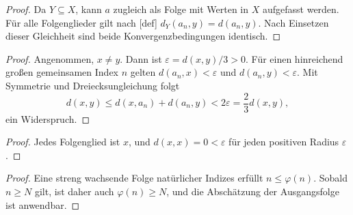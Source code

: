 \documentclass[main.tex]{subfiles}
\begin{document}
\begin{proof}
Da \(Y\subseteq X\), kann \(a\) zugleich als Folge mit Werten in \(X\)
aufgefasst werden. Für alle Folgenglieder gilt nach
[def]
\(d_Y(a_n,y)=d(a_n,y)\). Nach Einsetzen dieser Gleichheit sind beide
Konvergenzbedingungen identisch.
\end{proof}

\begin{proof}
Angenommen, \(x\neq y\). Dann ist
\(\varepsilon=d(x,y)/3>0\). Für einen hinreichend großen gemeinsamen
Index \(n\) gelten
\(d(a_n,x)<\varepsilon\) und \(d(a_n,y)<\varepsilon\). Mit Symmetrie und
Dreiecksungleichung folgt
\[
 d(x,y)\leq d(x,a_n)+d(a_n,y)
 <2\varepsilon=\frac23d(x,y),
\]
ein Widerspruch.
\end{proof}

\begin{proof}
Jedes Folgenglied ist \(x\), und \(d(x,x)=0<\varepsilon\) für jeden
positiven Radius \(\varepsilon\).
\end{proof}

\begin{proof}
Eine streng wachsende Folge natürlicher Indizes erfüllt
\(n\leq\varphi(n)\). Sobald \(n\geq N\) gilt, ist daher auch
\(\varphi(n)\geq N\), und die Abschätzung der Ausgangsfolge ist anwendbar.
\end{proof}
\end{document}
